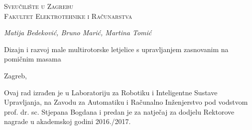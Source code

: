 \documentclass[11pt,a4paper]{article}
\begin{document}
\begin{titlepage}


\center

\textsc{\huge Sveučilište u Zagrebu} \\
\textsc{\huge Fakultet Elektrotehnike i Računarstva}

\vspace*{\fill}
\emph{\large Matija Bedeković, Bruno Marić, Martina Tomić}\\
\vspace{0.5cm}
\begin{Huge}
	Dizajn i razvoj male multirotorske letjelice s upravljanjem zasnovanim na pomičnim masama
\end{Huge}
\vspace*{\fill}

Zagreb, \the\year



\newpage
\thispagestyle{empty}
\vspace*{\fill}
\begin{large}
	Ovaj rad izrađen je u Laboratoriju za Robotiku i Inteligentne Sustave Upravljanja, na Zavodu za Automatiku i Računalno Inženjerstvo pod vodstvom prof. dr. sc. Stjepana Bogdana i predan je za natječaj za dodjelu Rektorove nagrade u akademskoj godini 2016./2017.
	\end{large}
\vspace*{\fill}
\end{titlepage}



\renewcommand{\cftsecleader}{\cftdotfill{\cftdotsep}}
\newpage
\tableofcontents
\thispagestyle{empty}
\newpage
\listoffigures
\thispagestyle{empty}
\newpage
\listoftables
\thispagestyle{empty}




\newpage
\setcounter{page}{1}
\end{document}
